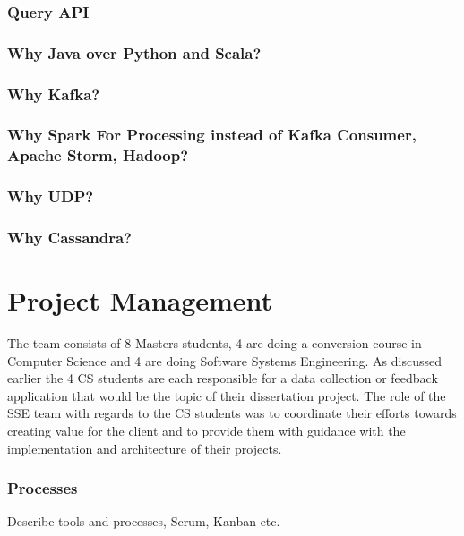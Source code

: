 \documentclass[prodmode,acmtosem]{acmsmall} %
\begin{document}
\subsubsection{Query API}


\subsubsection{Why Java over Python and Scala?}

\subsubsection{Why Kafka?}

\subsubsection{Why Spark For Processing instead of Kafka Consumer, Apache Storm, Hadoop?}

\subsubsection{Why UDP?}

\subsubsection{Why Cassandra?}



\section{Project Management}
The team consists of 8 Masters students, 4 are doing a conversion course in Computer Science and 4 are doing Software Systems Engineering. As discussed earlier the 4 CS students are each responsible for a data collection or feedback application that would be the topic of their dissertation project.
The role of the SSE team with regards to the CS students was to coordinate their efforts towards creating value for the client and to provide them with guidance with the implementation and architecture of their projects.

\subsubsection{Processes}
Describe tools and processes, Scrum, Kanban etc.
\end{document}
